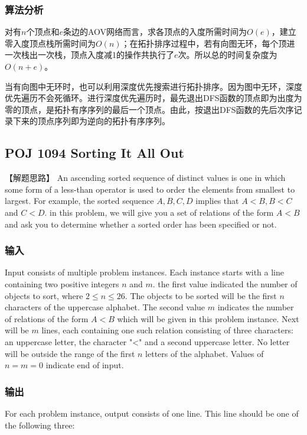\subsubsection{算法分析}
对有$n$个顶点和$e$条边的AOV网络而言，求各顶点的入度所需时间为$O(e)$，建立零入度顶点栈所需时间为$O(n)$；在拓扑排序过程中，若有向图无环，每个顶进一次栈出一次栈，顶点入度减1的操作共执行了$e$次。所以总的时间复杂度为$O(n+e)$。

当有向图中无环时，也可以利用深度优先搜索进行拓扑排序。因为图中无环，深度优先遍历不会死循环。进行深度优先遍历时，最先退出DFS函数的顶点即为出度为零的顶点，是拓扑有序序列的最后一个顶点。由此，按退出DFS函数的先后次序记录下来的顶点序列即为逆向的拓扑有序序列。


\subsection{POJ 1094 Sorting It All Out}
【解题思路】
An ascending sorted sequence of distinct values is one in which some form of a less-than operator is used to order the elements from smallest to largest. For example, the sorted sequence $A, B, C, D$ implies that $A < B, B < C$ and $C < D$. in this problem, we will give you a set of relations of the form $A < B$ and ask you to determine whether a sorted order has been specified or not.

\subsubsection{输入}
Input consists of multiple problem instances. Each instance starts with a line containing two positive integers $n$ and $m$. the first value indicated the number of objects to sort, where $2 \leq n \leq 26$. The objects to be sorted will be the first $n$ characters of the uppercase alphabet. The second value $m$ indicates the number of relations of the form $A < B$ which will be given in this problem instance. Next will be $m$ lines, each containing one such relation consisting of three characters: an uppercase letter, the character "<" and a second uppercase letter. No letter will be outside the range of the first $n$ letters of the alphabet. Values of $n = m = 0$ indicate end of input.

\subsubsection{输出}
For each problem instance, output consists of one line. This line should be one of the following three: 

